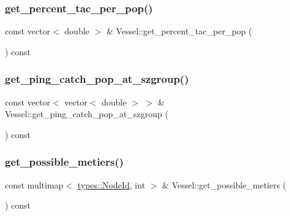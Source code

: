 \mbox{\label{class_vessel_a50b8cb9ce1063cfb0cef8b2855264f46}} 
\subsubsection{\texorpdfstring{get\_percent\_tac\_per\_pop()}{get\_percent\_tac\_per\_pop()}}
{\footnotesize\ttfamily const vector$<$ double $>$ \& Vessel\+::get\+\_\+percent\+\_\+tac\+\_\+per\+\_\+pop (\begin{DoxyParamCaption}{ }\end{DoxyParamCaption}) const}

\mbox{\label{class_vessel_a9e257788203a337116177c3a73e94bbe}} 
\subsubsection{\texorpdfstring{get\_ping\_catch\_pop\_at\_szgroup()}{get\_ping\_catch\_pop\_at\_szgroup()}}
{\footnotesize\ttfamily const vector$<$ vector$<$ double $>$ $>$ \& Vessel\+::get\+\_\+ping\+\_\+catch\+\_\+pop\+\_\+at\+\_\+szgroup (\begin{DoxyParamCaption}{ }\end{DoxyParamCaption}) const}

\mbox{\label{class_vessel_a988c875078c2347fdc1a1e50123f04c6}} 
\subsubsection{\texorpdfstring{get\_possible\_metiers()}{get\_possible\_metiers()}}
{\footnotesize\ttfamily const multimap$<$ \mbox{\hyperlink{classtypes_1_1_node_id}{types\+::\+Node\+Id}}, int $>$ \& Vessel\+::get\+\_\+possible\+\_\+metiers (\begin{DoxyParamCaption}{ }\end{DoxyParamCaption}) const}

\mbox{\label{class_vessel_aad7695f88b9ebfcce2d0c25857dc22c5}} 
